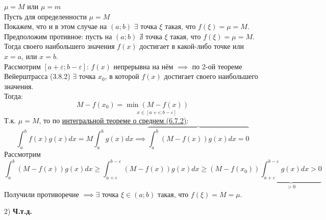 \documentclass[12pt]{article}
\begin{document}
\begin{adjustwidth}{1.5em}{1.5em}
\begin{adjustwidth}{1.5em}{1.5em}
\begin{adjustwidth}{1.5em}{1.5em}
                $\mu=M \text{ или } \mu=m$\\
                Пусть для определенности $\mu=M$\\
                Покажем, что и в этом случае на $(a;b)$ $\exists$ точка $\xi$ такая, что $f(\xi)=\mu=M$.\\
                Предположим противное: пусть на $(a;b)$ $\nexists$ точка $\xi$ такая, что $f(\xi)=\mu=M$.\\
                Тогда своего наибольшего значения $f(x)$ достигает в какой-либо точке или $x=a$, или $x=b$.\\
                Рассмотрим $[a+\varepsilon; b-\varepsilon]$: $f(x)$ непрерывна на нём $\implies$ по 2-ой теореме Вейерштрасса (3.8.2) $\exists$ точка $x_0$, в которой $f(x)$ достигает своего наибольшего значения.\\
                Тогда: 
                \[ M-f(x_0)=\underset{x \in [a+\varepsilon; b-\varepsilon]}{\min(M - f(x))} \]
                Т.к. $\mu=M$, то по \hyperref[th:6.7.2]{интегральной теореме о среднем (6.7.2)}: 
                \[ \int_{a}^{b} f(x)g(x)dx=M\int_{a}^{b}g(x)dx \implies \overbrace{\int_{a}^{b}(M-f(x))g(x)dx=0} \]
                Рассмотрим 
                \[ \int_{a}^{b}(M-f(x))g(x)dx\geq\int_{a+\varepsilon}^{b-\varepsilon}(M-f(x))g(x)dx \geq (M-f(x_0)) \underbrace{\int_{a+\varepsilon}^{b-\varepsilon} g(x)dx>0}_{>0} \]
                Получили противоречие $\implies \exists$ точка $\xi \in (a;b)$ такая, что $f(\xi)=M=\mu$.
                \begin{center}
                    2) \textbf{Ч.т.д.}
                \end{center}
            \end{adjustwidth}
        \end{adjustwidth}
    \end{adjustwidth}
\end{document}
